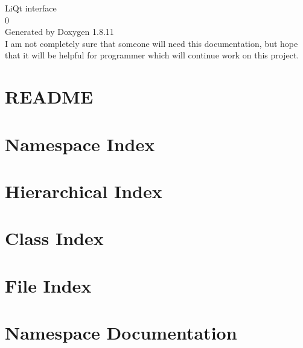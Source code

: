 \documentclass[twoside]{article}
\newcommand{\+}{\discretionary{\mbox{\scriptsize$\hookleftarrow$}}{}{}}
\begin{document}
\hypersetup{pageanchor=false,
             bookmarksnumbered=true,
             pdfencoding=unicode
            }
\begin{titlepage}
\vspace*{7cm}
\begin{center}%
{\Large Li\+Qt interface \\[1ex]\large 0 }\\
\vspace*{1cm}
{\large Generated by Doxygen 1.8.11}\\
I am not completely sure that someone will need this documentation, but hope that it will be helpful for programmer which will continue work on this project.
\end{center}
\end{titlepage}
\tableofcontents
{}
\hypersetup{pageanchor=true}

\section{R\+E\+A\+D\+ME}
\label{md__home_mishko_Temp_test0_README}
\hypertarget{md__home_mishko_Temp_test0_README}{}

\section{Namespace Index}

\section{Hierarchical Index}

\section{Class Index}

\section{File Index}

\section{Namespace Documentation}

\end{document}
